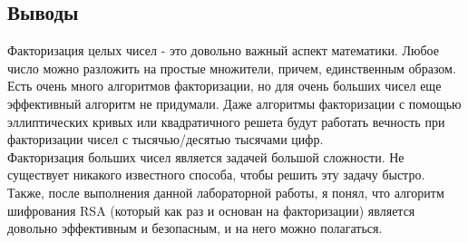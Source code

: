 \documentclass[12pt]{article}
\begin{document}
\subsection*{Выводы}
Факторизация целых чисел - это довольно важный аспект математики. Любое число можно разложить на простые множители, причем, единственным образом. Есть очень много алгоритмов факторизации, но для очень больших чисел еще эффективный алгоритм не придумали. Даже алгоритмы факторизации с помощью эллиптических кривых или квадратичного решета будут работать вечность при факторизации чисел с тысячью/десятью тысячами цифр.\\
Факторизация больших чисел является задачей большой сложности. Не существует никакого известного способа, чтобы решить эту задачу быстро. Также, после выполнения данной лабораторной работы, я понял, что алгоритм шифрования RSA (который как раз и основан на факторизации) является довольно эффективным и безопасным, и на него можно полагаться.
\end{document}
